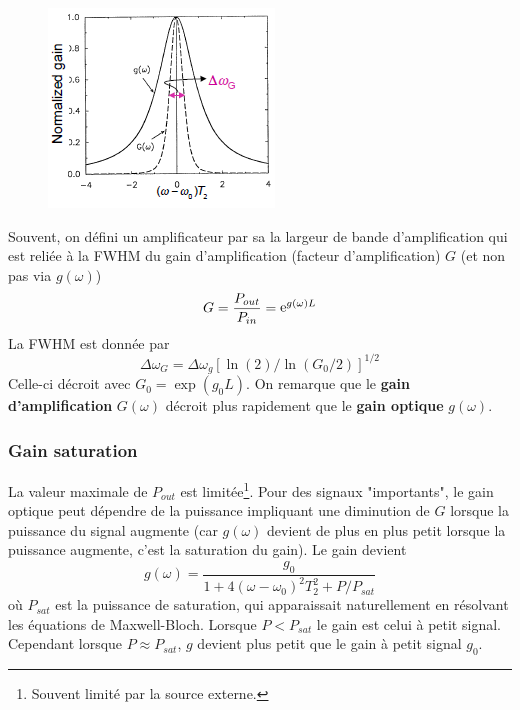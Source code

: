\newpage
	\begin{figure}
	\includegraphics[scale=0.8]{ch6/image2}
	\end{figure}
Souvent, on défini un amplificateur par sa la largeur de bande d'amplification qui est reliée à la
FWHM du gain d'amplification (facteur d'amplification) $G$ (et non pas via $g(\omega)$)
\begin{equation}
G = \frac{{{P_{out}}}}{{{P_{in}}}} = {{\mathop{\rm e}\nolimits} ^{g(\omega )L}}
\end{equation}
La FWHM est donnée par
\begin{equation}
\Delta {\omega _G} = \Delta {\omega _g}{\left[ {\ln (2)/\ln ({G_0}/2)} \right]^{1/2}}
\end{equation}
Celle-ci décroit avec $G_0=\exp(g_0L)$. On remarque que le \textbf{gain d'amplification} $G(\omega)$
décroit plus rapidement que le \textbf{gain optique} $g(\omega)$.

\subsubsection{Gain saturation}
La valeur maximale de $P_{out}$ est limitée\footnote{Souvent limité par la source externe.}. Pour
des signaux "importants", le gain optique peut dépendre de la puissance impliquant une diminution 
de $G$ lorsque la puissance du signal augmente (car $g(\omega)$ devient de plus en plus petit lorsque
la puissance augmente, c'est la saturation du gain). Le gain devient
\begin{equation}
g(\omega ) = \frac{{{g_0}}}{{1 + 4{{(\omega  - {\omega _0})}^2}T_2^2 + P/{P_{sat}}}}
\end{equation}
où $P_{sat}$ est la puissance de saturation, qui apparaissait naturellement en résolvant les 
équations de Maxwell-Bloch. Lorsque $P<P_{sat}$ le gain est celui à petit signal. Cependant lorsque
$P\approx P_{sat}$, $g$ devient plus petit que le gain à petit signal $g_0$.\\

